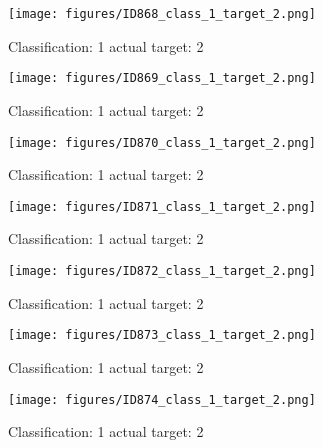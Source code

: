 \begin{figure}[h!]
\begin{center}
\texttt{[image: figures/ID868\_class\_1\_target\_2.png]}
\end{center}
\caption{ Classification: 1 actual target: 2}
\label{fig:ID868_class_1_target_2}
\end{figure}
\begin{figure}[h!]
\begin{center}
\texttt{[image: figures/ID869\_class\_1\_target\_2.png]}
\end{center}
\caption{ Classification: 1 actual target: 2}
\label{fig:ID869_class_1_target_2}
\end{figure}
\begin{figure}[h!]
\begin{center}
\texttt{[image: figures/ID870\_class\_1\_target\_2.png]}
\end{center}
\caption{ Classification: 1 actual target: 2}
\label{fig:ID870_class_1_target_2}
\end{figure}
\begin{figure}[h!]
\begin{center}
\texttt{[image: figures/ID871\_class\_1\_target\_2.png]}
\end{center}
\caption{ Classification: 1 actual target: 2}
\label{fig:ID871_class_1_target_2}
\end{figure}
\begin{figure}[h!]
\begin{center}
\texttt{[image: figures/ID872\_class\_1\_target\_2.png]}
\end{center}
\caption{ Classification: 1 actual target: 2}
\label{fig:ID872_class_1_target_2}
\end{figure}
\begin{figure}[h!]
\begin{center}
\texttt{[image: figures/ID873\_class\_1\_target\_2.png]}
\end{center}
\caption{ Classification: 1 actual target: 2}
\label{fig:ID873_class_1_target_2}
\end{figure}
\begin{figure}[h!]
\begin{center}
\texttt{[image: figures/ID874\_class\_1\_target\_2.png]}
\end{center}
\caption{ Classification: 1 actual target: 2}
\label{fig:ID874_class_1_target_2}
\end{figure}
